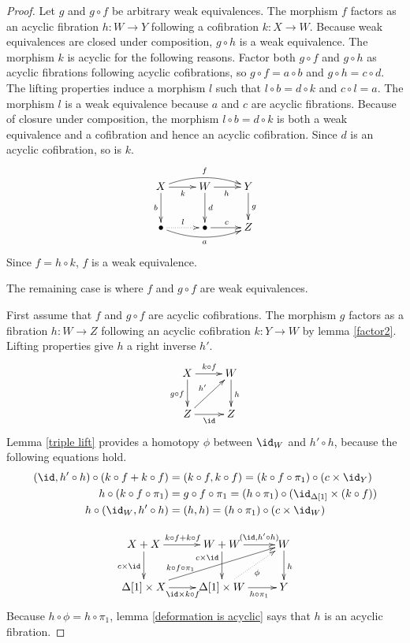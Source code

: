 \documentclass{tac}
\newcommand\of{:}
\newcommand\simplex\Delta
\begin{document}
\begin{proof}
Let $g$ and $g\circ f$ be arbitrary weak equivalences. The morphism $f$ factors as an acyclic fibration $h\of W\to Y$ following a cofibration $k\of X\to W$. Because weak equivalences are closed under composition, $g\circ h$ is a weak equivalence. The morphism $k$ is acyclic for the following reasons. Factor both $g\circ f$ and $g\circ h$ as acyclic fibrations following acyclic cofibrations, so $g\circ f = a\circ b$ and $g\circ h = c\circ d$. The lifting properties induce a morphism $l$ such that $l\circ b = d\circ k$ and $c\circ l = a$. The morphism $l$ is a weak equivalence because $a$ and $c$ are acyclic fibrations. Because of closure under composition, the morphism $l\circ b = d\circ k$ is both a weak equivalence and a cofibration and hence an acyclic cofibration. Since $d$ is an acyclic cofibration, so is $k$.
\[\xymatrix{
X\ar[r]_k\ar@/^2ex/[rr]^f\ar[d]_b & W\ar[r]_h\ar[d]^d & Y\ar[d]^g \\
\bullet\ar@/_2ex/[rr]_a\ar@{.>}[r]^l & \bullet\ar[r]^c & Z
}\]
Since $f = h\circ k$, $f$ is a weak equivalence.

The remaining case is where $f$ and $g\circ f$ are weak equivalences.

First assume that $f$ and $g\circ f$ are acyclic cofibrations. The morphism $g$ factors as a fibration $h\of W\to Z$ following an acyclic cofibration $k\of Y\to W$ by lemma \ref{factor2}. Lifting properties give $h$ a right inverse $h'$.
\[\xymatrix{
X\ar[r]^{k\circ f}\ar[d]_{g\circ f} & W\ar[d]^h\\
Z\ar[r]_\id \ar[ur]^{h'} & Z
}\]
Lemma \ref{triple lift} provides a homotopy $\phi$ between $\id_W$ and $h'\circ h$, because the following equations hold.
\begin{align*}
(\id,h'\circ h)\circ(k\circ f+k\circ f)&= (k\circ f,k\circ f) = (k\circ f\circ \pi_1)\circ(c\times \id_Y)\\
h\circ(k\circ f\circ\pi_1) &= g\circ f\circ\pi_1 = (h\circ\pi_1)\circ(\id_{\simplex[1]}\times (k\circ f))\\
h\circ(\id_W,h'\circ h) &= (h,h) = (h\circ\pi_1)\circ(c\times\id_W)
\end{align*}

\[\xymatrix{
X+X\ar[r]^{k\circ f+k\circ f}\ar[d]_{c\times \id} & W+W\ar[r]^(.6){(\id,h'\circ h)}\ar[d]_(.3){c\times\id} & W\ar[d]^h\\
\simplex[1]\times X\ar[r]_{\id\times k\circ f}\ar[urr]^(.3){k\circ f\circ\pi_1} & \simplex[1]\times W\ar[r]_(.6){h\circ \pi_1}\ar@{.>}[ur]_{\phi} & Y
}\]
Because $h\circ \phi = h\circ \pi_1$, lemma \ref{deformation is acyclic} says that $h$ is an acyclic fibration.


\end{proof}
\end{document}
